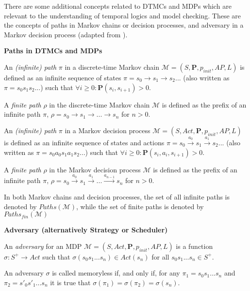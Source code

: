 There are some additional concepts related to DTMCs and MDPs which are relevant to the understanding of temporal logics and model checking. These are the concepts of paths in Markov chains or decision processes, and adversary in a Markov decision process (adapted from \cite{bk08, fknp11}).

{\begin{defi}
{\setlength{\parskip}{2em}
\textbf{Paths in DTMCs and MDPs}\vspace{1em}\\}
{\setlength{\parskip}{1em} 
An \textit{(infinite) path} $\pi$ in a discrete-time Markov chain $\mathcal{M} = (S, \mathbf{P}, p_{init}, AP, L)$ is defined as an infinite sequence of states $\pi = s_0 \to s_1 \to s_2 ...$ (also written as $\pi = s_0s_1s_2...$) such that $\forall i \geq 0: \mathbf{P}(s_i, s_{i+1}) > 0$.

A \textit{finite path} $\rho$ in the discrete-time Markov chain $\mathcal{M}$ is defined as the prefix of an infinite path $\pi$, $\rho = s_0 \to s_1 \to ... \to s_n$ for $n > 0$.

An \textit{(infinite) path} $\pi$ in a Markov decision process $\mathcal{M} = (S, Act, \mathbf{P}, p_{init}, AP, L)$ is defined as an infinite sequence of states and actions $\pi = s_0 \xrightarrow{a_0} s_1 \xrightarrow{a_1} s_2 ...$ (also written as $\pi = s_0a_0s_1a_1s_2...$) such that $\forall i \geq 0: \mathbf{P}(s_i, a_i, s_{i+1}) > 0$.

A \textit{finite path} $\rho$ in the Markov decision process $\mathcal{M}$ is defined as the prefix of an infinite path $\pi$, $\rho = s_0 \xrightarrow{a_0} s_1 \xrightarrow{a_1} ... \xrightarrow{a_{n-1}} s_n$ for $n > 0$.

In both Markov chains and decision processes, the set of all infinite paths is denoted by $Paths(\mathcal{M})$, while the set of finite paths is denoted by $Paths_{fin}(\mathcal{M})$
}
\end{defi}}

{\begin{defi}
{\setlength{\parskip}{2em}
\textbf{Adversary (alternatively Strategy or Scheduler)}\vspace{1em}\\}
{\setlength{\parskip}{1em} 
An \textit{adversary} for an MDP $\mathcal{M} = (S, Act, \mathbf{P}, p_{init}, AP, L)$ is a function $\sigma: S^+ \to Act$ such that $\sigma(s_0s_1...s_n) \in Act(s_n)$ for all $s_0s_1...s_n \in S^+$.

An adversary $\sigma$ is called memoryless if, and only if, for any $\pi_1 = s_0s_1...s_n$ and $\pi_2 = s'_0s'_1...s_n$ it is true that $\sigma(\pi_1) = \sigma(\pi_2) = \sigma(s_n)$.
}
\end{defi}}

